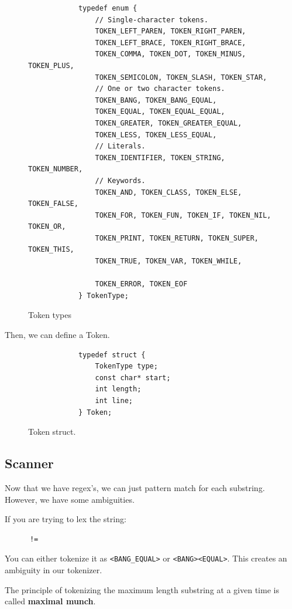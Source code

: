 	\begin{figure}[H]
		\centering 
		\begin{lstlisting}
			typedef enum {
				// Single-character tokens.
				TOKEN_LEFT_PAREN, TOKEN_RIGHT_PAREN,
				TOKEN_LEFT_BRACE, TOKEN_RIGHT_BRACE,
				TOKEN_COMMA, TOKEN_DOT, TOKEN_MINUS, TOKEN_PLUS,
				TOKEN_SEMICOLON, TOKEN_SLASH, TOKEN_STAR,
				// One or two character tokens.
				TOKEN_BANG, TOKEN_BANG_EQUAL,
				TOKEN_EQUAL, TOKEN_EQUAL_EQUAL,
				TOKEN_GREATER, TOKEN_GREATER_EQUAL,
				TOKEN_LESS, TOKEN_LESS_EQUAL,
				// Literals.
				TOKEN_IDENTIFIER, TOKEN_STRING, TOKEN_NUMBER,
				// Keywords.
				TOKEN_AND, TOKEN_CLASS, TOKEN_ELSE, TOKEN_FALSE,
				TOKEN_FOR, TOKEN_FUN, TOKEN_IF, TOKEN_NIL, TOKEN_OR,
				TOKEN_PRINT, TOKEN_RETURN, TOKEN_SUPER, TOKEN_THIS,
				TOKEN_TRUE, TOKEN_VAR, TOKEN_WHILE,

				TOKEN_ERROR, TOKEN_EOF
			} TokenType;
		\end{lstlisting}
		\caption{Token types} 
		\label{fig:tokens_c}
	\end{figure}

	Then, we can define a Token. 

	\begin{figure}[H]
		\centering 
		\begin{lstlisting}
			typedef struct {
				TokenType type;
				const char* start;
				int length; 
				int line;
			} Token;
		\end{lstlisting}
		\caption{Token struct.} 
		\label{fig:token_struct}
	\end{figure}

\subsection{Scanner}

  Now that we have regex's, we can just pattern match for each substring. However, we have some ambiguities. 

  \begin{example}[Ambiguities]
    \label{ex:ambiguities}
    If you are trying to lex the string: 
    \begin{lstlisting}
      !=
    \end{lstlisting}
    You can either tokenize it as \texttt{<BANG\_EQUAL>} or \texttt{<BANG><EQUAL>}. This creates an ambiguity in our tokenizer. 
  \end{example}

  \begin{definition}
    \label{def:maximal-munch}
    The principle of tokenizing the maximum length substring at a given time is called \textbf{maximal munch}. 
  \end{definition}

